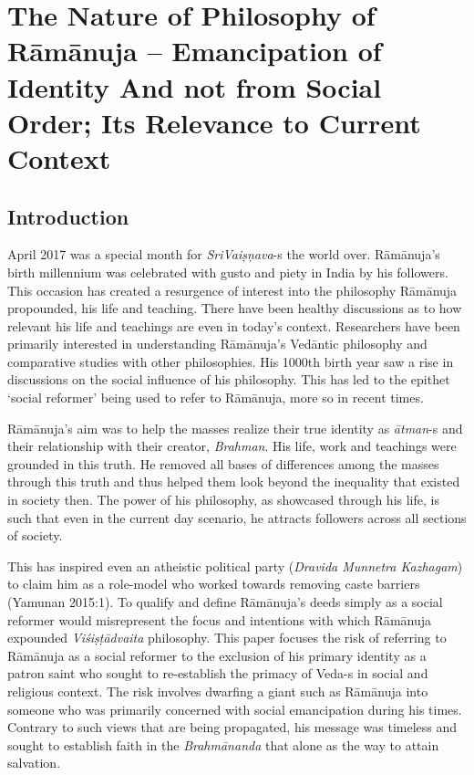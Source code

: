 
\chapter{The Nature of Philosophy of Rāmānuja – Emancipation of Identity And not from Social Order; Its Relevance to Current Context}



\section*{Introduction}

April 2017 was a special month for \textit{SriVaiṣņava}-s the world over. Rāmānuja’s birth millennium was celebrated with gusto and piety in India by his followers. This occasion has created a resurgence of interest into the philosophy Rāmānuja propounded, his life and teaching. There have been healthy discussions as to how relevant his life and teachings are even in today’s context. Researchers have been primarily interested in understanding Rāmānuja’s Vedāntic philosophy and comparative studies with other philosophies. His 1000th birth year saw a rise in discussions on the social influence of his philosophy. This has led to the epithet ‘social reformer’ being used to refer to Rāmānuja, more so in recent times.

Rāmānuja’s aim was to help the masses realize their true identity as \textit{ātman}-s and their relationship with their creator, \textit{Brahman}. His life, work and teachings were grounded in this truth. He removed all bases of differences among the masses through this truth and thus helped them look beyond the inequality that existed in society then. The power of his philosophy, as showcased through his life, is such that even in the current day scenario, he attracts followers across all sections of society.

This has inspired even an atheistic political party (\textit{Dravida Munnetra Kazhagam}) to claim him as a role-model who worked towards removing caste barriers (Yamunan 2015:1). To qualify and define Rāmānuja’s deeds simply as a social reformer would misrepresent the focus and intentions with which Rāmānuja expounded \textit{Viśiṣṭādvaita} philosophy. This paper focuses the risk of referring to Rāmānuja as a social reformer to the exclusion of his primary identity as a patron saint who sought to re-establish the primacy of Veda-s in social and religious context. The risk involves dwarfing a giant such as Rāmānuja into someone who was primarily concerned with social emancipation during his times. Contrary to such views that are being propagated, his message was timeless and sought to establish faith in the \textit{Brahmānanda} that alone as the way to attain salvation.

